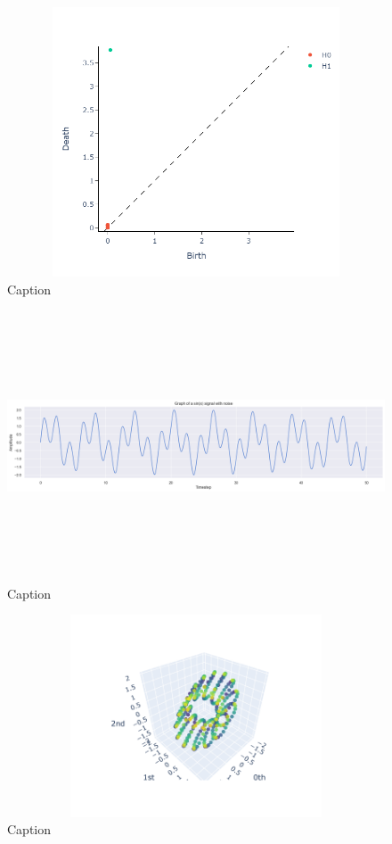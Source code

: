 \documentclass{article}
\begin{document}
\begin{figure}[h!]
    \centering
    \includegraphics[width= 12cm, height = 8cm]{PD sin(10x).png}
    \caption{Caption}
    \label{fig:enter-label}
\end{figure}

\begin{figure}[h!]
    \centering
    \includegraphics[width= 16cm, height = 8cm]{sin with noise.png}
    \caption{Caption}
    \label{fig:enter-label}
\end{figure}


\begin{figure}[h!]
    \centering
    \includegraphics[width= 12cm, height = 6cm]{PC sin with noise.png}
    \caption{Caption}
    \label{fig:enter-label}
\end{figure}
\end{document}
